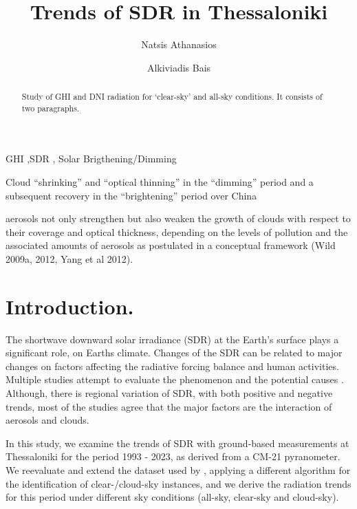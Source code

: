 \documentclass[preprint, 3p,
authoryear]{elsarticle} %
\begin{document}
\begin{frontmatter}

  \title{Trends of SDR in Thessaloniki}
    \author[Laboratory of Atmospheric Physics]{Natsis Athanasios%
  }
    \author[Laboratory of Atmospheric Physics]{Alkiviadis Bais%
  }
  
  \begin{abstract}
  Study of GHI and DNI radiation for `clear-sky' and all-sky conditions.
  It consists of two paragraphs.
  \end{abstract}
    \begin{keyword}
    GHI \sep SDR \sep 
    Solar Brigthening/Dimming
  \end{keyword}
  
 \end{frontmatter}

Cloud ``shrinking'' and ``optical thinning'' in the ``dimming'' period
and a subsequent recovery in the ``brightening'' period over China

aerosols not only strengthen but also weaken the growth of clouds with
respect to their coverage and optical thickness, depending on the levels
of pollution and the associated amounts of aerosols as postulated in a
conceptual framework (Wild 2009a, 2012, Yang et al 2012).

\hypertarget{introduction.}{%
\section{Introduction.}\label{introduction.}}

The shortwave downward solar irradiance (SDR) at the Earth's surface
plays a significant role, on Earths climate. Changes of the SDR can be
related to major changes on factors affecting the radiative forcing
balance and human activities. Multiple studies attempt to evaluate the
phenomenon and the potential causes
\citep{Ohvril2009, Schwarz2020, Wild2009, Wild2012, Xia2007, Zerefos2009}.
Although, there is regional variation of SDR, with both positive and
negative trends, most of the studies agree that the major factors are
the interaction of aerosols and clouds.

In this study, we examine the trends of SDR with ground-based
measurements at Thessaloniki for the period 1993 - 2023, as derived from
a CM-21 pyranometer. We reevaluate and extend the dataset used by
\citet{Bais2013}, applying a different algorithm for the identification
of clear-/cloud-sky instances, and we derive the radiation trends for
this period under different sky conditions (all-sky, clear-sky and
cloud-sky).
\end{document}
